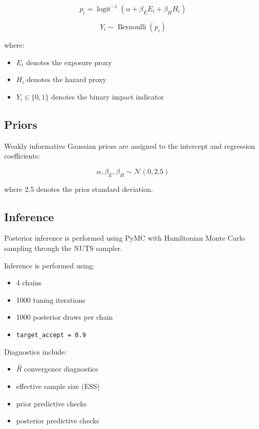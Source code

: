 \documentclass[
]{article}
\providecommand{\tightlist}{%
  \setlength{\itemsep}{0pt}\setlength{\parskip}{0pt}}
\begin{document}
\[
p_i =
\operatorname{logit}^{-1}
\left(
\alpha + \beta_E E_i + \beta_H H_i
\right)
\]

\[
Y_i \sim \operatorname{Bernoulli}(p_i)
\]

where:

\begin{itemize}
\tightlist
\item
  \(E_i\) denotes the exposure proxy
\item
  \(H_i\) denotes the hazard proxy
\item
  \(Y_i \in \{0,1\}\) denotes the binary impact indicator
\end{itemize}

\subsection{Priors}\label{priors}

Weakly informative Gaussian priors are assigned to the intercept and
regression coefficients:

\[
\alpha, \beta_E, \beta_H \sim \mathcal{N}(0, 2.5)
\]

where 2.5 denotes the prior standard deviation.

\subsection{Inference}\label{inference}

Posterior inference is performed using PyMC with Hamiltonian Monte Carlo
sampling through the NUTS sampler.

Inference is performed using:

\begin{itemize}
\tightlist
\item
  4 chains
\item
  1000 tuning iterations
\item
  1000 posterior draws per chain
\item
  \texttt{target\_accept\ =\ 0.9}
\end{itemize}

Diagnostics include:

\begin{itemize}
\tightlist
\item
  \(\hat{R}\) convergence diagnostics
\item
  effective sample size (ESS)
\item
  prior predictive checks
\item
  posterior predictive checks
\end{itemize}
\end{document}

